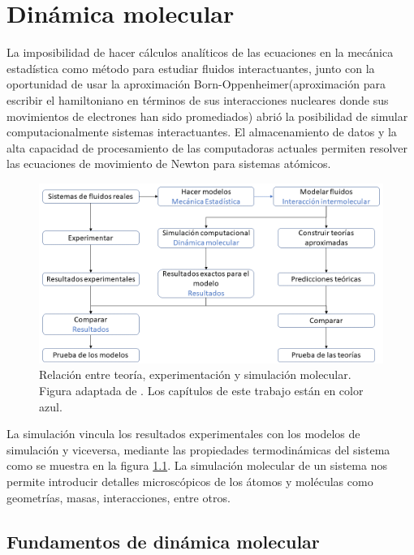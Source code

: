 
\chapter{Dinámica molecular}

La imposibilidad de hacer cálculos analíticos de las ecuaciones en la mecánica estadística como método para estudiar fluidos interactuantes, junto con la oportunidad de usar la aproximación Born-Oppenheimer(aproximación para escribir el hamiltoniano en términos de sus interacciones nucleares donde sus movimientos de electrones han sido promediados) abrió la posibilidad de simular computacionalmente sistemas interactuantes. El almacenamiento de datos y la alta capacidad de procesamiento de las computadoras actuales permiten resolver las ecuaciones de movimiento de Newton para sistemas atómicos.\\

\begin{figure}[!h]
    \centering
    \includegraphics[width=.9\textwidth,keepaspectratio=true]{MD/experimentsimulationtheoryfig.png}
    \caption{Relación entre teoría, experimentación y simulación molecular. Figura adaptada de \cite{Allen2017}. Los capítulos de este trabajo están en color azul.}
    \label{fig:conteexpsim}
\end{figure}

La simulación vincula los resultados experimentales con los modelos de simulación y viceversa, mediante las propiedades termodinámicas del sistema como se muestra en la figura \ref{fig:conteexpsim}. La simulación molecular de un sistema nos permite introducir detalles microscópicos de los átomos y moléculas como geometrías, masas, interacciones, entre otros.\\

\section{Fundamentos de dinámica molecular}


